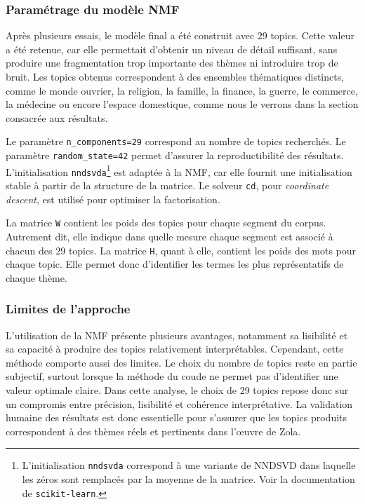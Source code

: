 \subsubsection{Paramétrage du modèle NMF}

Après plusieurs essais, le modèle final a été construit avec 29 topics. Cette valeur a été retenue, car elle permettait d'obtenir un niveau de détail suffisant, sans produire une fragmentation trop importante des thèmes ni introduire trop de bruit. Les topics obtenus correspondent à des ensembles thématiques distincts, comme le monde ouvrier, la religion, la famille, la finance, la guerre, le commerce, la médecine ou encore l'espace domestique, comme nous le verrons dans la section consacrée aux résultats.

Le paramètre \texttt{n\_components=29} correspond au nombre de topics recherchés. Le paramètre \texttt{random\_state=42} permet d'assurer la reproductibilité des résultats. L'initialisation \texttt{nndsvda}\footnote{L'initialisation \texttt{nndsvda} correspond à une variante de NNDSVD dans laquelle les zéros sont remplacés par la moyenne de la matrice. Voir la documentation de \texttt{scikit-learn}.} est adaptée à la NMF, car elle fournit une initialisation stable à partir de la structure de la matrice. Le solveur \texttt{cd}, pour \textit{coordinate descent}, est utilisé pour optimiser la factorisation.

La matrice \texttt{W} contient les poids des topics pour chaque segment du corpus. Autrement dit, elle indique dans quelle mesure chaque segment est associé à chacun des 29 topics. La matrice \texttt{H}, quant à elle, contient les poids des mots pour chaque topic. Elle permet donc d'identifier les termes les plus représentatifs de chaque thème.

\subsubsection{Limites de l’approche}

L’utilisation de la NMF présente plusieurs avantages, notamment sa lisibilité et sa capacité à produire des topics relativement interprétables. Cependant, cette méthode comporte aussi des limites. Le choix du nombre de topics reste en partie subjectif, surtout lorsque la méthode du coude ne permet pas d’identifier une valeur optimale claire. Dans cette analyse, le choix de 29 topics repose donc sur un compromis entre précision, lisibilité et cohérence interprétative. La validation humaine des résultats est donc essentielle pour s'assurer que les topics produits correspondent à des thèmes réels et pertinents dans l'œuvre de Zola.

